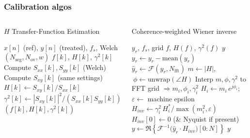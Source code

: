 \documentclass[aspectratio=169,10pt]{beamer}
\begin{document}
\begin{frame}
  \frametitle{Calibration algos}
\begin{columns}[c]
    \begin{algorithm}[H] %
        \footnotesize
        \caption{$H$ Transfer-Function Estimation}\label{alg:H}
        \begin{algorithmic}[1]
            \Require $x[n]$ (ref), $y[n]$ (treated), $f_s$, Welch $(N_{\mathrm{seg}},N_{\mathrm{ov}},w)$
            \Ensure $f[k]$, $H[k]$, $\gamma^2[k]$
            \State Compute $S_{xx}[k],S_{yy}[k]$ (Welch)
            \State Compute $S_{xy}[k]$ (same settings)
            \State $H[k]\gets S_{xy}[k]/S_{xx}[k]$
            \State $\gamma^2[k]\gets |S_{xy}[k]|^2/(S_{xx}[k]S_{yy}[k])$
            \State \Return $(f[k],H[k],\gamma^2[k])$
        \end{algorithmic}
    \end{algorithm}
        \begin{algorithm}[H]
            \footnotesize
            \caption{Coherence-weighted Wiener inverse}\label{alg:inv}
            \begin{algorithmic}[1]
                \Require $y_r$, $f_s$, grid $f$, $H(f)$, $\gamma^2(f)$
                \Ensure $y$
                \State $y_r \leftarrow y_r - \mathrm{mean}(y_r)$
                \State $\hat{y}_r\gets\mathcal{F}(y_r,N_{\mathrm{fft}})$
                \State $m\gets|H|$, $\ \phi\gets\mathrm{unwrap}(\angle H)$
                \State Interp $m,\phi,\gamma^2$ to FFT grid $\Rightarrow m_i,\phi_i,\gamma_i^2$
                \State $H_i\gets m_i\,e^{j\phi_i}$;\ \ $\varepsilon\gets$ machine epsilon
                \State $H_{\!inv}\gets \gamma_i^2\,H_i^{\!*}/\max(m_i^2,\varepsilon)$
                \State $H_{\!inv}[0]\gets 0$ \quad(\& Nyquist if present)
                \State $y\gets \Re\!\left\{\mathcal{F}^{-1}\!\big(\hat{y}_r\cdot H_{\!inv}\big)[0{:}N]\right\}$
                \State \Return $y$
            \end{algorithmic}
        \end{algorithm}

  \end{columns}
\end{frame}


%     
%     
\end{document}

